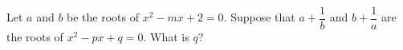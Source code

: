 Let \(a\) and \(b\) be the roots of \(x^2-mx+2=0\). Suppose that \(a+\dfrac{1}{b}\) and \(b+\dfrac{1}{a}\) are the roots of \(x^2-px+q=0\). What is \(q\)?
